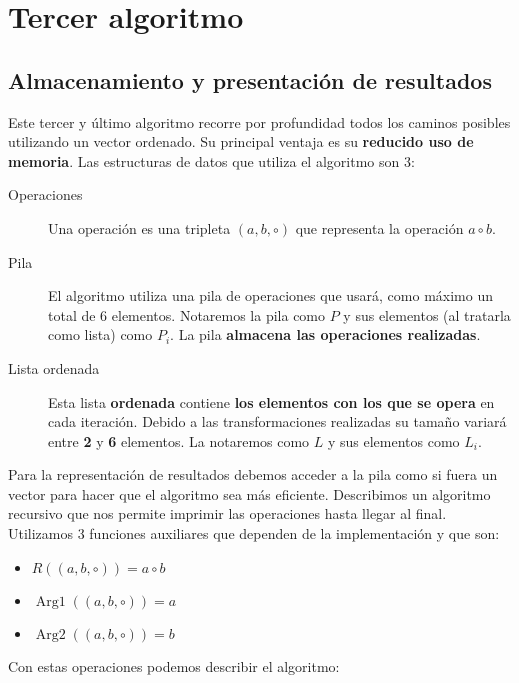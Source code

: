 \section{Tercer algoritmo}

\subsection{Almacenamiento y presentación de resultados}

Este tercer y último algoritmo recorre por profundidad todos los caminos
posibles utilizando un vector ordenado. Su principal ventaja es su \textbf{reducido
uso de memoria}. Las estructuras de datos que utiliza el algoritmo son 3:

\begin{description}
	\item[Operaciones] Una operación es una tripleta $(a,b,\circ)$ que representa
	la operación $a \circ b$.
	\item[Pila] El algoritmo utiliza una pila de operaciones que usará, como
	máximo un total de 6 elementos. Notaremos la pila como $P$ y sus elementos (al tratarla como
	lista) como $P_i$. La pila \textbf{almacena las operaciones realizadas}.
	\item[Lista ordenada] Esta lista \textbf{ordenada} contiene
	\textbf{los elementos con los que	se opera} en cada iteración.
	Debido a las transformaciones realizadas su tamaño variará entre \textbf{2} y
	\textbf{6} elementos. La notaremos como $L$ y sus elementos como $L_i$.
\end{description}

Para la representación de resultados debemos acceder a la pila como si
fuera un vector para hacer que el algoritmo sea más eficiente.
Describimos un algoritmo recursivo que nos permite imprimir las operaciones
hasta llegar al final. Utilizamos 3 funciones auxiliares que dependen
de la implementación y que son:

\begin{itemize}
	\item $R((a,b,\circ)) = a \circ b$
	\item $\operatorname{Arg1}((a,b,\circ)) = a$
	\item $\operatorname{Arg2}((a,b,\circ)) = b$
\end{itemize}

Con estas operaciones podemos describir el algoritmo:

